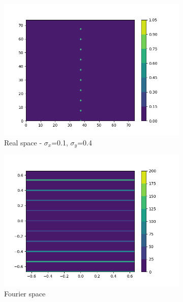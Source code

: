 \documentclass{article}
\begin{document}
\begin{figure}
\begin{subfigure}{0.45\textwidth}
                \centering
                \includegraphics[width=\textwidth]{real_2d_74_1column_highysig.png}
                \caption{Real space - $\sigma_x$=0.1, $\sigma_y$=0.4}\label{fig:real_2d_74_1column_highysig}
        \end{subfigure}
        \begin{subfigure}{0.45\textwidth}
                \centering
                \includegraphics[width=\textwidth]{fourier_2d_74_1column_highysig.png}
                \caption{Fourier space}\label{fig:fourier_2d_74_1column_highysig}
        \end{subfigure}
	\begin{subfigure}{0.45\textwidth}
                \centering

\end{subfigure}
\end{figure}
\end{document}
